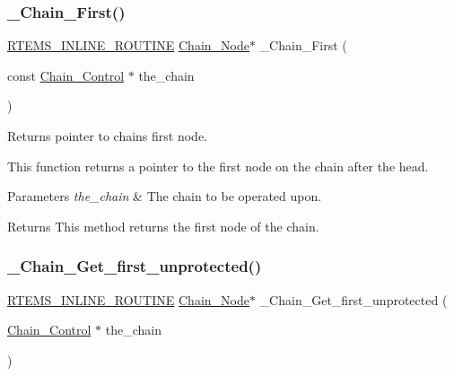 \subsubsection{\texorpdfstring{\_Chain\_First()}{\_Chain\_First()}}
{\footnotesize\ttfamily \mbox{\hyperlink{group__RTEMSScoreBaseDefs_gac216239df231d5dbd15e3520b0b9313f}{R\+T\+E\+M\+S\+\_\+\+I\+N\+L\+I\+N\+E\+\_\+\+R\+O\+U\+T\+I\+NE}} \mbox{\hyperlink{group__RTEMSScoreChain_ga0dd4bfcca1ac7f90de2842e447846d3d}{Chain\+\_\+\+Node}}$\ast$ \+\_\+\+Chain\+\_\+\+First (\begin{DoxyParamCaption}\item[{const \mbox{\hyperlink{unionChain__Control}{Chain\+\_\+\+Control}} $\ast$}]{the\+\_\+chain }\end{DoxyParamCaption})}



Returns pointer to chain\textquotesingle{}s first node. 

This function returns a pointer to the first node on the chain after the head.


\begin{DoxyParams}{Parameters}
{\em the\+\_\+chain} & The chain to be operated upon.\\
\hline
\end{DoxyParams}
\begin{DoxyReturn}{Returns}
This method returns the first node of the chain. 
\end{DoxyReturn}
\mbox{\label{group__RTEMSScoreChain_ga1b1dedf23d978ddd9b30b0d1feb6e093}} 
\subsubsection{\texorpdfstring{\_Chain\_Get\_first\_unprotected()}{\_Chain\_Get\_first\_unprotected()}}
{\footnotesize\ttfamily \mbox{\hyperlink{group__RTEMSScoreBaseDefs_gac216239df231d5dbd15e3520b0b9313f}{R\+T\+E\+M\+S\+\_\+\+I\+N\+L\+I\+N\+E\+\_\+\+R\+O\+U\+T\+I\+NE}} \mbox{\hyperlink{group__RTEMSScoreChain_ga0dd4bfcca1ac7f90de2842e447846d3d}{Chain\+\_\+\+Node}}$\ast$ \+\_\+\+Chain\+\_\+\+Get\+\_\+first\+\_\+unprotected (\begin{DoxyParamCaption}\item[{\mbox{\hyperlink{unionChain__Control}{Chain\+\_\+\+Control}} $\ast$}]{the\+\_\+chain }\end{DoxyParamCaption})}



